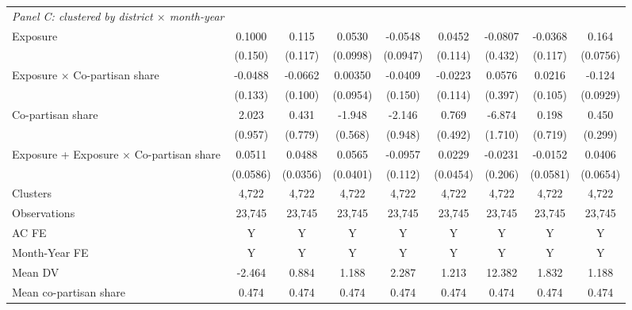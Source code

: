 {\begin{tabular}{l*{8}{c}}
\multicolumn{9}{l}{\textit{Panel C: clustered by district $\times$ month-year}} \\
Exposure    &      0.1000         &       0.115         &      0.0530         &     -0.0548         &      0.0452         &     -0.0807         &     -0.0368         &       0.164\sym{**} \\
            &     (0.150)         &     (0.117)         &    (0.0998)         &    (0.0947)         &     (0.114)         &     (0.432)         &     (0.117)         &    (0.0756)         \\
Exposure $\times$ Co-partisan share&     -0.0488         &     -0.0662         &     0.00350         &     -0.0409         &     -0.0223         &      0.0576         &      0.0216         &      -0.124         \\
            &     (0.133)         &     (0.100)         &    (0.0954)         &     (0.150)         &     (0.114)         &     (0.397)         &     (0.105)         &    (0.0929)         \\
Co-partisan share&       2.023\sym{**} &       0.431         &      -1.948\sym{***}&      -2.146\sym{**} &       0.769         &      -6.874\sym{***}&       0.198         &       0.450         \\
            &     (0.957)         &     (0.779)         &     (0.568)         &     (0.948)         &     (0.492)         &     (1.710)         &     (0.719)         &     (0.299)         \\

Exposure + Exposure $\times$ Co-partisan share&      0.0511         &      0.0488         &      0.0565         &     -0.0957         &      0.0229         &     -0.0231         &     -0.0152         &      0.0406         \\
            &    (0.0586)         &    (0.0356)         &    (0.0401)         &     (0.112)         &    (0.0454)         &     (0.206)         &    (0.0581)         &    (0.0654)         \\
Clusters    &       4,722         &       4,722         &       4,722         &       4,722         &       4,722         &       4,722         &       4,722         &       4,722         \\
\midrule



Observations&      23,745&      23,745&      23,745&      23,745&      23,745&      23,745&      23,745&      23,745\\
AC FE       &           Y&           Y&           Y&           Y&           Y&           Y&           Y&           Y\\
Month-Year FE&           Y&           Y&           Y&           Y&           Y&           Y&           Y&           Y\\
Mean DV     &      -2.464&       0.884&       1.188&       2.287&       1.213&      12.382&       1.832&       1.188\\
Mean co-partisan share&       0.474&       0.474&       0.474&       0.474&       0.474&       0.474&       0.474&       0.474\\
\bottomrule
\end{tabular}
}
